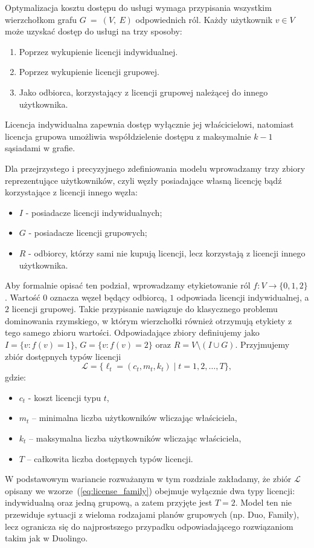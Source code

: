 Optymalizacja kosztu dostępu do usługi wymaga przypisania wszystkim wierzchołkom grafu $G ~=~ (V,~E)$ odpowiednich ról. Każdy użytkownik $v \in V$ może uzyskać dostęp do usługi na trzy sposoby:
\begin{enumerate}
  \item Poprzez wykupienie licencji indywidualnej.
  \item Poprzez wykupienie licencji grupowej.
  \item Jako odbiorca, korzystający z licencji grupowej należącej do innego użytkownika.
\end{enumerate}
Licencja indywidualna zapewnia dostęp wyłącznie jej właścicielowi, natomiast licencja grupowa umożliwia współdzielenie dostępu z maksymalnie $k-1$ sąsiadami w grafie.

Dla przejrzystego i precyzyjnego zdefiniowania modelu wprowadzamy trzy zbiory reprezentujące użytkowników, czyli węzły posiadające własną licencję bądź korzystające z licencji innego węzła:
\begin{itemize}
  \item $I$ - posiadacze licencji indywidualnych;
  \item $G$ - posiadacze licencji grupowych;
  \item $R$ - odbiorcy, którzy sami nie kupują licencji, lecz korzystają z licencji innego użytkownika.
\end{itemize}

Aby formalnie opisać ten podział, wprowadzamy etykietowanie ról $f:V\to\{0,1,2\}$.
Wartość $0$ oznacza węzeł będący odbiorcą, $1$ odpowiada licencji indywidualnej, a $2$ licencji grupowej.
Takie przypisanie nawiązuje do klasycznego problemu dominowania rzymskiego, w którym wierzchołki również otrzymują etykiety z tego samego zbioru wartości.
Odpowiadające zbiory definiujemy jako $I=\{v:f(v)=1\}$, $G=\{v:f(v)=2\}$ oraz $R=V\setminus(I\cup G)$.
Przyjmujemy zbiór dostępnych typów licencji
\begin{equation}
  \mathcal{L} = \{ \ell_t = (c_t, m_t, k_t) \mid t = 1,2,\dots,T \},
  \label{eq:license_family}
\end{equation}
gdzie:
\begin{itemize}
  \item $c_t$ - koszt licencji typu $t$,
  \item $m_t$ -- minimalna liczba użytkowników wliczając właściciela,
  \item $k_t$ -- maksymalna liczba użytkowników wliczając właściciela,
  \item $T$ -- całkowita liczba dostępnych typów licencji.
\end{itemize}
W podstawowym wariancie rozważanym w tym rozdziale zakładamy, że zbiór $\mathcal{L}$ opisany we wzorze~(\ref{eq:license_family}) obejmuje wyłącznie dwa typy licencji: indywidualną oraz jedną grupową, a zatem przyjęte jest $T = 2$. Model ten nie przewiduje sytuacji z wieloma rodzajami planów grupowych (np. Duo, Family), lecz ogranicza się do najprostszego przypadku odpowiadającego rozwiązaniom takim jak w Duolingo.

